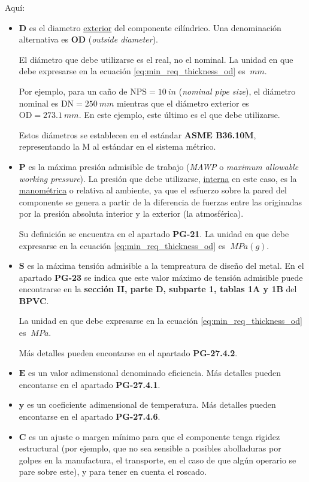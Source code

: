 Aquí:
\begin{itemize}
     \item $\mathbf{D}$ es el diametro \underline{exterior} del componente cilíndrico. Una denominación alternativa es $\mathbf{OD}$ (\textit{outside diameter}). 
     
     El diámetro que debe utilizarse es el real, no el nominal. La unidad en que debe expresarse en la ecuación \ref{eq:min_req_thickness_od} es $\SI{}{mm}$.
     
     Por ejemplo, para un caño de $\text{NPS}=\SI{10}{in}$ (\textit{nominal pipe size}), el diámetro nominal es $\text{DN}=\SI{250}{mm}$ mientras que el diámetro exterior es $\text{OD}=\SI{273.1}{mm}$. En este ejemplo, este último es el que debe utilizarse.

     Estos diámetros se establecen en el estándar \textbf{ASME B36.10M}, representando la M al estándar en el sistema métrico.

     \item $\mathbf{P}$ es la máxima presión admisible de trabajo (\textit{MAWP} o \textit{maximum allowable working pressure}). La presión que debe utilizarse, \underline{interna} en este caso, es la \underline{manométrica} o relativa al ambiente, ya que el esfuerzo sobre la pared del componente se genera a partir de la diferencia de fuerzas entre las originadas por la presión absoluta interior y la exterior (la atmosférica).
     
     Su definición se encuentra en el apartado \textbf{PG-21}. La unidad en que debe expresarse en la ecuación \ref{eq:min_req_thickness_od} es $\SI{}{MPa(g)}$.   

     \item $\mathbf{S}$ es la máxima tensión admisible a la tempreatura de diseño del metal. En el apartado \textbf{PG-23} se indica que este valor máximo de tensión admisible puede encontrarse en la \textbf{sección II, parte D, subparte 1, tablas 1A y 1B} del \textbf{BPVC}.
     
     La unidad en que debe expresarse en la ecuación \ref{eq:min_req_thickness_od} es $\SI{}{MPa}$.

     Más detalles pueden encontarse en el apartado \textbf{PG-27.4.2}.

     \item $\mathbf{E}$ es un valor adimensional denominado eficiencia. Más detalles pueden encontarse en el apartado \textbf{PG-27.4.1}.
     \item $\mathbf{y}$ es un coeficiente adimensional de temperatura. Más detalles pueden encontarse en el apartado \textbf{PG-27.4.6}.
     \item $\mathbf{C}$ es un ajuste o margen mínimo para que el componente tenga rigidez estructural (por ejemplo, que no sea sensible a posibles abolladuras por golpes en la manufactura, el transporte, en el caso de que algún operario se pare sobre este), y para tener en cuenta el roscado.
     

\end{itemize}
